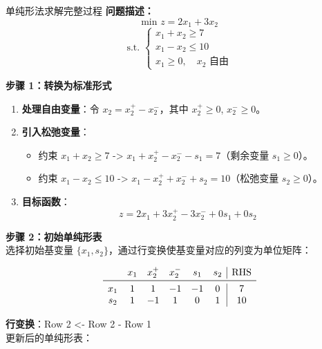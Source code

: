     \begin{exbox}{单纯形法求解完整过程}
        \textbf{问题描述：}
        \[
        \text{min } z = 2x_1 + 3x_2
        \]
        \[
        \text{s.t. }
        \begin{cases}
        x_1 + x_2 \geq 7 \\
        x_1 - x_2 \leq 10 \\
        x_1 \geq 0, \quad x_2 \text{ 自由}
        \end{cases}
        \]
        
        \medskip
        
        \textbf{步骤 1：转换为标准形式}
        \begin{enumerate}
          \item \textbf{处理自由变量}：令 \( x_2 = x_2^+ - x_2^- \)，其中 \( x_2^+ \geq 0 \), \( x_2^- \geq 0 \)。
          \item \textbf{引入松弛变量}：
            \begin{itemize}
              \item 约束 \( x_1 + x_2 \geq 7 \) -> \( x_1 + x_2^+ - x_2^- - s_1 = 7 \)（剩余变量 \( s_1 \geq 0 \)）。
              \item 约束 \( x_1 - x_2 \leq 10 \) -> \( x_1 - x_2^+ + x_2^- + s_2 = 10 \)（松弛变量 \( s_2 \geq 0 \)）。
            \end{itemize}
          \item \textbf{目标函数}：
            \[
            z = 2x_1 + 3x_2^+ - 3x_2^- + 0s_1 + 0s_2
            \]
        \end{enumerate}
        
        \medskip
        
        \textbf{步骤 2：初始单纯形表}\\
        选择初始基变量 \( \{x_1, s_2\} \)，通过行变换使基变量对应的列变为单位矩阵：
        
        \[
        \begin{array}{cccccc|c}
         & x_1 & x_2^+ & x_2^- & s_1 & s_2 & \text{RHS} \\
        \midrule
        x_1 & 1 & 1 & -1 & -1 & 0 & 7 \\
        s_2 & 1 & -1 & 1 & 0 & 1 & 10 \\
        \end{array}
        \]
        
        \textbf{行变换}：Row 2 <- Row 2 - Row 1\\
        更新后的单纯形表：
        

\end{exbox}
